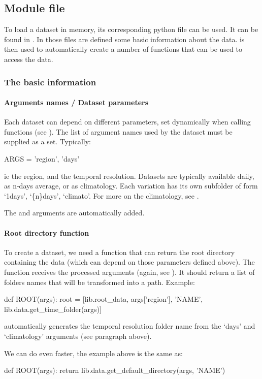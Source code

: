 \subsection{Module file}
To load a dataset in memory, its corresponding python file can be used. It can be found in .
In those files are defined some basic information about the data.
 is then used to automatically create a number of functions that can be used to access the data.
\subsubsection{The basic information}
\paragraph{Arguments names / Dataset parameters}
Each dataset can depend on different parameters, set dynamically when calling functions (see ).
The list of argument names used by the dataset must be supplied as a set.
Typically:
\begin{python}
ARGS = {'region', 'days'}
\end{python}
ie the region, and the temporal resolution.
Datasets are typically available daily, as n-days average, or as climatology.
Each variation has its own subfolder of form `1days', `\{n\}days', `climato'.
For more on the climatology, see .

The  and  arguments are automatically added.

\paragraph{Root directory function}
To create a dataset, we need a function that can return the root directory containing the data (which can depend on those parameters defined above).
The function receives the processed arguments (again, see ).
It should return a list of folders names that will be transformed into a path. Example:
\begin{python}
def ROOT(args):
    root = [lib.root_data, args['region'], 'NAME', lib.data.get_time_folder(args)]
\end{python}
 automatically generates the temporal resolution folder name from the `days' and `climatology' arguments (see paragraph above).

We can do even faster, the example above is the same as:
\begin{python}
def ROOT(args):
    return lib.data.get_default_directory(args, 'NAME')
\end{python}

